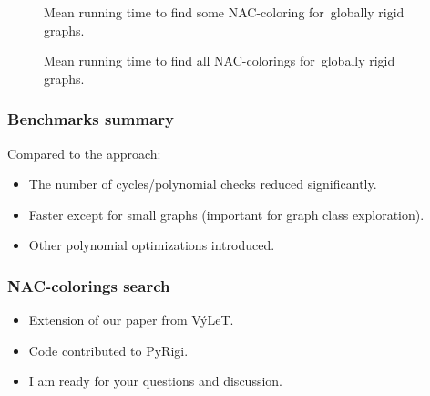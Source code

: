 \documentclass[aspectratio=\myaspectratio]{beamer}
\newcommand{\BenchFigureScale}{0.42}
\begin{document}
\begin{frame}
	\begin{figure}[thbp]
		\centering
		\scalebox{\BenchFigureScale}{}
		\caption[Mean runtime for~globally rigid graphs (some)]{
			Mean running time to find some NAC-coloring for~globally rigid graphs.}%
		\label{fig:graph_globally_rigid_first_runtime}
	\end{figure}%
	\begin{figure}[thbp]
		\centering
		\scalebox{\BenchFigureScale}{}
		\caption[Mean runtime for~globally rigid graphs (all)]{
			Mean running time to find all NAC-colorings for~globally rigid graphs.}%
		\label{fig:graph_globally_rigid_all_runtime}
	\end{figure}%
\end{frame}

\begin{frame}
	\frametitle{Benchmarks summary}

	Compared to the \Naive{} approach:
	\begin{itemize}
		\item
		      The number of cycles/polynomial checks reduced significantly.
		\item
		      Faster except for small graphs (important for graph class exploration).
		\item
		      Other polynomial optimizations introduced.
	\end{itemize}
\end{frame}

\begin{frame}
	\frametitle{NAC-colorings search}
	\begin{itemize}
		\item
		      Extension of our paper from VýLeT.
		\item
		      Code contributed to PyRigi.
		\item
		      I am ready for your questions and discussion.
	\end{itemize}
\end{frame}
\end{document}
